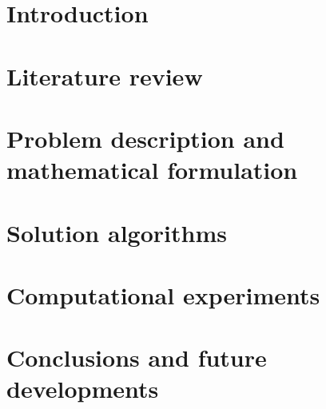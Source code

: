 \documentclass{Configuration_Files/PoliMi3i_thesis}
\theoremstyle{definition}
\theoremstyle{observation}
\begin{document}
    \chapter*{Introduction}
    \label{chapter:introduction}%
    

    \chapter{Literature review}
    \label{chapter:literature}%
    

    \chapter{Problem description and mathematical formulation}
    \label{chapter:problem}%
    

    \chapter{Solution algorithms}
    \label{chapter:heuristics}%
    

    \chapter{Computational experiments}
    \label{chapther:experiments}%
    

    \chapter{Conclusions and future developments}
    \label{chapther:conclusions}%
    
    \cite{knuth74} 




    \cleardoublepage
    \appendix
\end{document}
